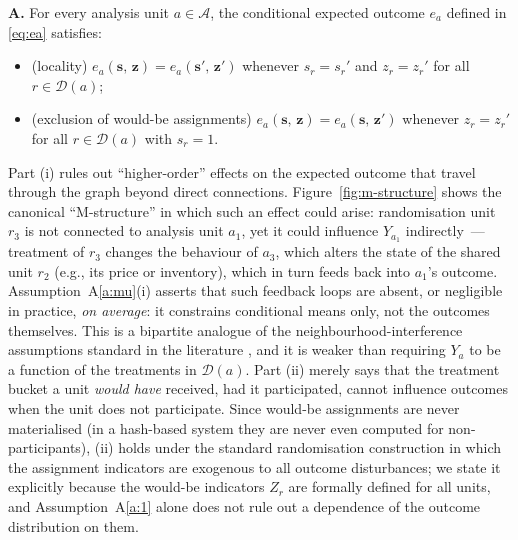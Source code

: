 \documentclass[sigconf]{acmart}
\newcounter{assumption}
\newenvironment{assumption}{\refstepcounter{assumption}\par\medskip\noindent\textbf{A\theassumption.}\enspace}{\par\medskip}
\begin{document}
\begin{assumption}\label{a:mu}
For every analysis unit $a\in\mathcal A$, the conditional expected outcome $e_a$ defined in \eqref{eq:ea} satisfies:
\begin{itemize}
    \item[\textup{(i)}] \textup{(locality)} $e_a(\mathbf s,\,\mathbf z) = e_a(\mathbf s',\,\mathbf z')$ whenever $s_r=s_r'$ and $z_r=z_r'$ for all $r\in\mathcal D(a)$;
    \item[\textup{(ii)}] \textup{(exclusion of would-be assignments)} $e_a(\mathbf s,\,\mathbf z) = e_a(\mathbf s,\,\mathbf z')$ whenever $z_r=z_r'$ for all $r\in\mathcal D(a)$ with $s_r=1$.
\end{itemize}
\end{assumption}

Part (i) rules out ``higher-order'' effects on the expected outcome that travel through the graph beyond direct connections. Figure~\ref{fig:m-structure} shows the canonical ``M-structure'' in which such an effect could arise: randomisation unit $r_3$ is not connected to analysis unit $a_1$, yet it could influence $Y_{a_1}$ indirectly~--- treatment of $r_3$ changes the behaviour of $a_3$, which alters the state of the shared unit $r_2$ (e.g., its price or inventory), which in turn feeds back into $a_1$'s outcome. Assumption~A\ref{a:mu}(i) asserts that such feedback loops are absent, or negligible in practice, \emph{on average}: it constrains conditional means only, not the outcomes themselves. This is a bipartite analogue of the neighbourhood-interference assumptions standard in the literature \cite{aronow2017estimating,harshaw2023erl,shi2025scalableanalysisbipartiteexperiments}, and it is weaker than requiring $Y_a$ to be a function of the treatments in $\mathcal D(a)$. Part (ii) merely says that the treatment bucket a unit \emph{would have} received, had it participated, cannot influence outcomes when the unit does not participate. Since would-be assignments are never materialised (in a hash-based system they are never even computed for non-participants), (ii) holds under the standard randomisation construction in which the assignment indicators are exogenous to all outcome disturbances; we state it explicitly because the would-be indicators $Z_r$ are formally defined for all units, and Assumption~A\ref{a:1} alone does not rule out a dependence of the outcome distribution on them.
\end{document}
